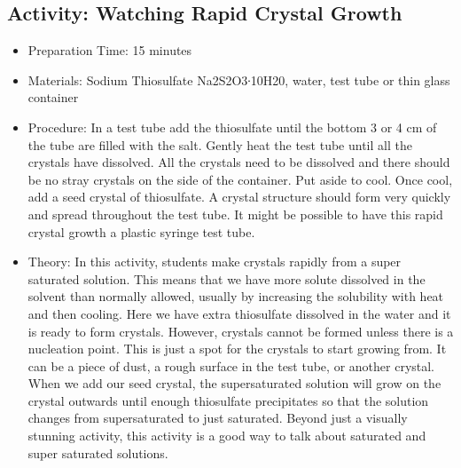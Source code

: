 \begin{itemize}
{\begin{itemize}
\subsection{Activity: Watching Rapid Crystal Growth}
\begin{itemize}
\item{Preparation Time: 15 minutes}
\item{Materials: Sodium Thiosulfate Na2S2O3∙10H20, water, test tube or thin glass container}
\item{Procedure: In a test tube add the thiosulfate until the bottom 3 or 4 cm of the tube are filled with the salt. Gently heat the test tube until all the crystals have dissolved. All the crystals need to be dissolved and there should be no stray crystals on the side of the container. Put aside to cool. Once cool, add a seed crystal of thiosulfate. A crystal structure should form very quickly and spread throughout the test tube. It might be possible to have this rapid crystal growth a plastic syringe test tube.}
\item{Theory: In this activity, students make crystals rapidly from a super saturated solution. This means that we have more solute dissolved in the solvent than normally allowed, usually by increasing the solubility with heat and then cooling. Here we have extra thiosulfate dissolved in the water and it is ready to form crystals. However, crystals cannot be formed unless there is a nucleation point. This is just a spot for the crystals to start growing from. It can be a piece of dust, a rough surface in the test tube, or another crystal. When we add our seed crystal, the supersaturated solution will grow on the crystal outwards until enough thiosulfate precipitates so that the solution changes from supersaturated to just saturated. Beyond just a visually stunning activity, this activity is a good way to talk about saturated and super saturated solutions. }
\end{itemize}


\end{itemize}}
\end{itemize}
